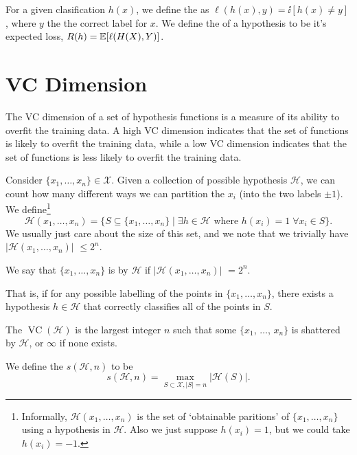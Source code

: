 \documentclass[a4paper]{amsart}
\begin{document}
For a given clasification $h(x)$, we define the  as $\ell(h(x), y)= \ii[h(x) \neq y]$, where $y$ the the correct label for $x$. We define the  of a hypothesis to be it's expected loss, $R(h) = \mathbb{E}[\ell(H(X), Y)]$.

\section{VC Dimension}

The VC dimension of a set of hypothesis functions is a measure of its ability to overfit the training data. A high VC dimension indicates that the set of functions is likely to overfit the training data, while a low VC dimension indicates that the set of functions is less likely to overfit the training data.


Consider $\{x_1, \dots, x_n \} \in \mathcal{X}$.
Given a collection of possible hypothesis $\mathcal{H}$, we can count how many different ways we can partition the $x_i$ (into the two labels $\pm 1$). We define\footnote{Informally, $\mathcal{H}(x_1, \dots, x_n)$ is the set of `obtainable paritions' of $\{x_1, \dots, x_n\}$ using a hypothesis in $\mathcal{H}$. Also we just suppose $h(x_i) = 1$, but we could take $h(x_i) = -1$.}
$$
\mathcal{H}(x_1, \dots, x_n) = \{S \subseteq \{x_1, \dots, x_n \} \mid \exists h \in \mathcal{H} \text{ where } h(x_i) = 1\; \forall x_i \in S\}.
$$
We usually just care about the size of this set, and we note that we trivially have $|\mathcal{H}(x_1, \dots, x_n)|$ $\leq 2^n$.


\begin{definition*}[Shattered]
    We say that $\{x_1, \dots, x_n\}$ is  by $\mathcal{H}$ if $|\mathcal{H}(x_1, \dots, x_n)|$ $= 2^n$. 
\end{definition*}

That is, if for any possible labelling of the points in $\{x_1, \dots, x_n\}$, there exists a hypothesis $h \in \mathcal{H}$ that correctly classifies all of the points in $S$.


\begin{definition*}[VC Dimension]
    The  $\operatorname{VC}(\mathcal{H})$ is the largest integer $n$ such that some $\{x_1$, $\dots$, $x_n\}$ is shattered by $\mathcal{H}$, or $\infty$ if none exists.
\end{definition*}

\begin{definition*}
    We define the  $s(\mathcal{H}, n)$ to be
    $$
    s(\mathcal{H}, n) = \max_{S \subset \mathcal{X}, |S| = n} |\mathcal{H}(S)|.
    $$
\end{definition*}
\end{document}
